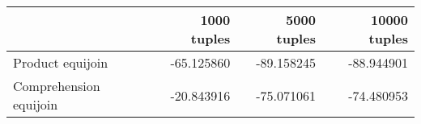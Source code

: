 \begin{tabular}{lrrr}
\toprule
 & 1000 tuples & 5000 tuples & 10000 tuples \\
\midrule
Product equijoin & -65.125860 & -89.158245 & -88.944901 \\
Comprehension equijoin & -20.843916 & -75.071061 & -74.480953 \\
\bottomrule
\end{tabular}
